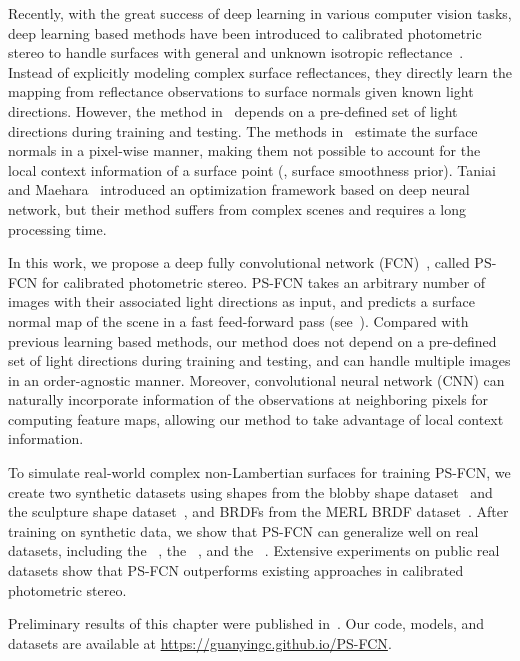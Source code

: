 Recently, with the great success of deep learning in various computer vision tasks, deep learning based methods have been introduced to calibrated photometric stereo to handle surfaces with general and unknown isotropic reflectance~\cite{santo2017deep,ikehata2018cnn,Taniai18}. Instead of explicitly modeling complex surface reflectances, they directly learn the mapping from reflectance observations to surface normals given known light directions. 
However, the method in~\cite{santo2017deep} depends on a pre-defined set of light directions during training and testing. The methods in~\cite{santo2017deep,ikehata2018cnn} estimate the surface normals in a pixel-wise manner, making them not possible to account for the local context information of a surface point (\eg, surface smoothness prior).
Taniai and Maehara~\cite{Taniai18} introduced an optimization framework based on deep neural network, but their method suffers from complex scenes and requires a long processing time. 

In this work, we propose a deep fully convolutional network (FCN)~\cite{long2015fully}, called PS-FCN for calibrated photometric stereo.
PS-FCN takes an arbitrary number of images with their associated light directions as input, and predicts a surface normal map of the scene in a fast feed-forward pass (see~).
Compared with previous learning based methods, our method does not depend on a pre-defined set of light directions during training and testing, and can handle multiple images in an order-agnostic manner. 
Moreover, convolutional neural network (CNN) can naturally incorporate information of the observations at neighboring pixels for computing feature maps, allowing our method to take advantage of local context information. 

To simulate real-world complex non-Lambertian surfaces for training PS-FCN, we create two synthetic datasets using shapes from the blobby shape dataset~\cite{johnson2011shape} and the sculpture shape dataset~\cite{wiles2017silnet}, and BRDFs from the MERL BRDF dataset~\cite{matusik2003merl}. After training on synthetic data, we show that PS-FCN can generalize well on real datasets, including the \diligent~\cite{shi2019benchmark}, the \gourd~\cite{alldrin2008p}, and the \lightstage~\cite{einarsson2006relighting}. 
Extensive experiments on public real datasets show that PS-FCN outperforms existing approaches in calibrated photometric stereo.

Preliminary results of this chapter were published in~\cite{chen2018ps,chen2020deepps}.
Our code, models, and datasets are available at \url{https://guanyingc.github.io/PS-FCN}. 


